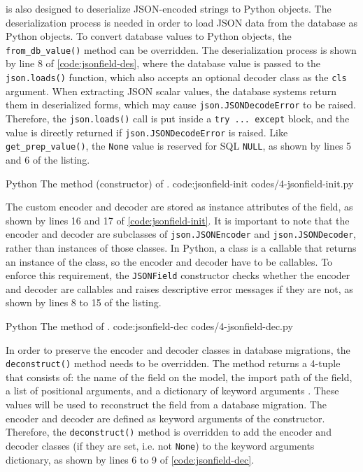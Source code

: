  is also designed to deserialize JSON-encoded strings to Python
objects. The deserialization process is needed in order to load JSON data from
the database as Python objects. To convert database values to Python objects,
the \verb|from_db_value()| method can be overridden. The deserialization
process is shown by line 8 of \autoref{code:jsonfield-des}, where the database
value is passed to the \verb|json.loads()| function, which also accepts an
optional decoder class as the \verb|cls| argument. When extracting JSON scalar
values, the database systems return them in deserialized forms, which may cause
\verb|json.JSONDecodeError| to be raised. Therefore, the \verb|json.loads()|
call is put inside a \verb|try ... except| block, and the value is directly
returned if \verb|json.JSONDecodeError| is raised. Like
\verb|get_prep_value()|, the \verb|None| value is reserved for SQL \verb|NULL|,
as shown by lines 5 and 6 of the listing.

\listing
{Python}
{The  method (constructor) of .}
{code:jsonfield-init}
{codes/4-jsonfield-init.py}

The custom encoder and decoder are stored as instance attributes of the field,
as shown by lines 16 and 17 of \autoref{code:jsonfield-init}. It is important
to note that the encoder and decoder are subclasses of \verb|json.JSONEncoder|
and \verb|json.JSONDecoder|, rather than instances of those classes. In Python,
a class is a callable that returns an instance of the class, so the encoder and
decoder have to be callables. To enforce this requirement, the \verb|JSONField|
constructor checks whether the encoder and decoder are callables and raises
descriptive error messages if they are not, as shown by lines 8 to 15 of the
listing.

\listing
{Python}
{The  method of .}
{code:jsonfield-dec}
{codes/4-jsonfield-dec.py}

In order to preserve the encoder and decoder classes in database migrations,
the \verb|deconstruct()| method needs to be overridden. The method returns a
4-tuple that consists of: the name of the field on the model, the import path
of the field, a list of positional arguments, and a dictionary of keyword
arguments \cite{django:model_fields}. These values will be used to reconstruct
the field from a database migration. The encoder and decoder are defined as
keyword arguments of the constructor. Therefore, the \verb|deconstruct()|
method is overridden to add the encoder and decoder classes (if they are set,
i.e. not \verb|None|) to the keyword arguments dictionary, as shown by lines 6
to 9 of \autoref{code:jsonfield-dec}.

